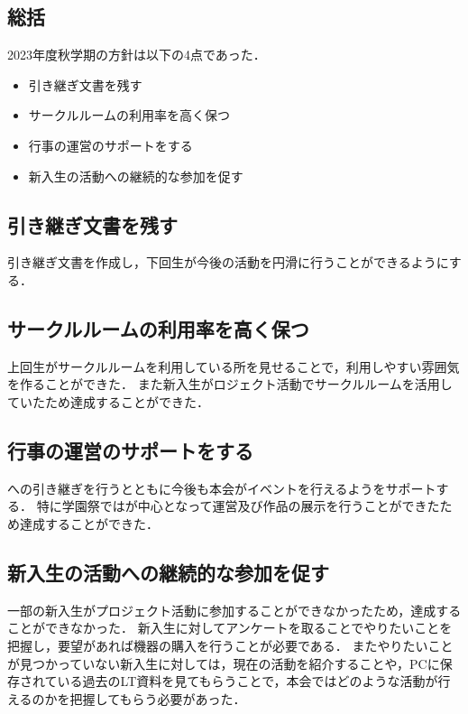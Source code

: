 \subsection*{\thirdGrade{}総括}


2023年度秋学期の\thirdGrade{}方針は以下の4点であった．

\begin{itemize}
    \item 引き継ぎ文書を残す
    \item サークルルームの利用率を高く保つ
    \item 行事の運営のサポートをする
    \item 新入生の活動への継続的な参加を促す
\end{itemize}

\subsection*{引き継ぎ文書を残す}
引き継ぎ文書を作成し，下回生が今後の活動を円滑に行うことができるようにする．

\subsection*{サークルルームの利用率を高く保つ}
上回生がサークルルームを利用している所を見せることで，利用しやすい雰囲気を作ることができた．
また新入生がロジェクト活動でサークルルームを活用していたため達成することができた．

\subsection*{行事の運営のサポートをする}
\secondGrade{}への引き継ぎを行うとともに今後も本会がイベントを行えるよう\secondGrade{}をサポートする．
特に学園祭では\secondGrade{}が中心となって運営及び作品の展示を行うことができたため達成することができた．

\subsection*{新入生の活動への継続的な参加を促す}
一部の新入生がプロジェクト活動に参加することができなかったため，達成することができなかった．
新入生に対してアンケートを取ることでやりたいことを把握し，要望があれば機器の購入を行うことが必要である．
またやりたいことが見つかっていない新入生に対しては，現在の活動を紹介することや，PCに保存されている過去のLT資料を見てもらうことで，本会ではどのような活動が行えるのかを把握してもらう必要があった．
